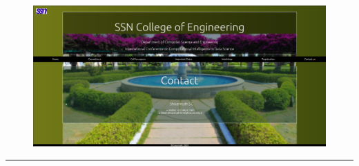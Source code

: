 \documentclass[12pt,letterpaper]{article}
\begin{document}
\newpage
\subsubsection*{}
\begin{figure}[h]
    \centering
    \includegraphics[width = \textwidth]{Pics/contact.png}
\end{figure}

\hrule
\end{document}
